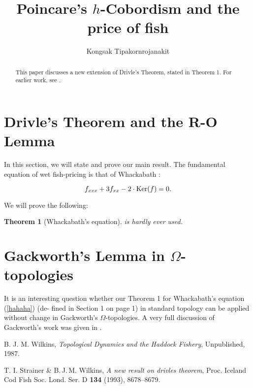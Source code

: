 \documentclass[12pt, a4paper]{article}
\newtheorem{theorem}{Theorem}
\begin{document}
 	\title{Poincare's $h$-Cobordism and the price of fish}
 	\author{Kongsak Tipakornrojanakit}
 	\maketitle
 	
 	\vspace{0.2in}
 	
 	\tableofcontents
 	
 	\vspace{0.4in}
 	
 	
 	\begin{abstract}
 		This paper discusses a new extension of Drivle’s Theorem, stated in Theorem 1. For earlier work, see \cite{sw, bjm}.
 	\end{abstract}
 	
 	\section{Drivle's Theorem and the R-O Lemma}
 	In this section, we will state and prove our main result. The fundamental equation of wet fish-pricing is that of Whackabath \cite{sw}:
 	
		\begin{equation}\label{hahaha}
		f_{xxx} + 3f_{xx} - 2 \cdot  \textnormal{Ker}(f) = 0.
		\end{equation}
		
 	\noindent We will prove the following:
 	
 	\begin{theorem}
 	[Whackabath's equation]{\normalfont{(\ref{hahaha})} \textit{is hardly ever used.}}
	\end{theorem}
	
 	\section{Gackworth's Lemma in $\Omega$-topologies}
	It is an interesting question whether our Theorem 1 for Whackabath's equation (\ref{hahaha}) (de- fined in Section 1 on page 1) in standard topology can be applied without change in Gackworth's $\Omega$-topologies. A very full discussion of Gackworth's work was given in \cite{bjm}.

 	\begin{thebibliography}{9}
 	B. J. M. Wilkins,
 	\emph{Topological Dynamics and the Haddock Fishery},
 	Unpublished, 1987.

 	T. I. Strainer \& B.\,J.\,M. Wilkins,
 	\emph{A new result on drivles theorem},
 	Proc. Iceland Cod Fish Soc. Lond. Ser. D \textbf{134} (1993), 8678--8679.
 	\end{thebibliography}
 	
 	
 	
\end{document}
